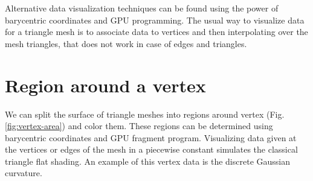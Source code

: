 \label{section:vertex-area-chapter}
Alternative data visualization techniques can be found using the power of barycentric coordinates and GPU programming.
The usual way to visualize data for a triangle mesh is to associate data to vertices and then interpolating over the mesh triangles, that does not work in case of edges and triangles.


\section{Region around a vertex}
We can split the surface of triangle meshes into regions around vertex (Fig. \ref{fig:vertex-area}) and color them.
These regions can be determined using barycentric coordinates and GPU fragment program. Visualizing data given at the vertices or edges of the mesh in a piecewise constant simulates the classical triangle flat shading.
An example of this vertex data is the discrete Gaussian curvature.
